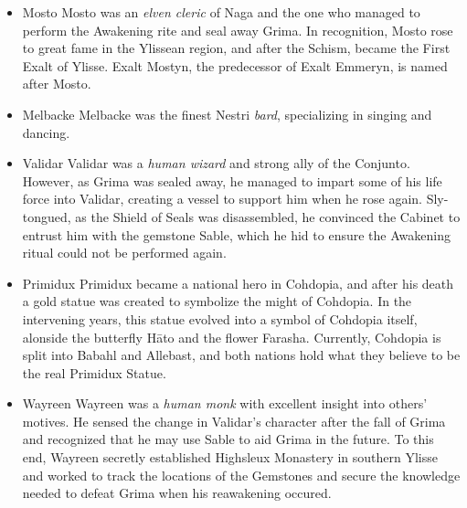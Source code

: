 \begin{itemize}
\item Mosto
Mosto was an \textit{elven cleric} of Naga and the one who managed to perform the Awakening rite and seal away Grima. In recognition, Mosto rose to great fame in the Ylissean region, and after the Schism, became the First Exalt of Ylisse. Exalt Mostyn, the predecessor of Exalt Emmeryn, is named after Mosto.

\item Melbacke
Melbacke was the finest Nestri \textit{bard}, specializing in singing and dancing.

\item Validar
Validar was a \textit{human wizard} and strong ally of the Conjunto. However, as Grima was sealed away, he managed to impart some of his life force into Validar, creating a vessel to support him when he rose again. Sly-tongued, as the Shield of Seals was disassembled, he convinced the Cabinet to entrust him with the gemstone Sable, which he hid to ensure the Awakening ritual could not be performed again.

\item Primidux
Primidux became a national hero in Cohdopia, and after his death a gold statue was created to symbolize the might of Cohdopia. In the intervening years, this statue evolved into a symbol of Cohdopia itself, alonside the butterfly H\=ato and the flower Farasha. Currently, Cohdopia is split into Babahl and Allebast, and both nations hold what they believe to be the real Primidux Statue.

\item Wayreen
Wayreen was a \textit{human monk} with excellent insight into others' motives. He sensed the change in Validar's character after the fall of Grima and recognized that he may use Sable to aid Grima in the future. To this end, Wayreen secretly established Highsleux Monastery in southern Ylisse and worked to track the locations of the Gemstones and secure the knowledge needed to defeat Grima when his reawakening occured. 
\end{itemize}
